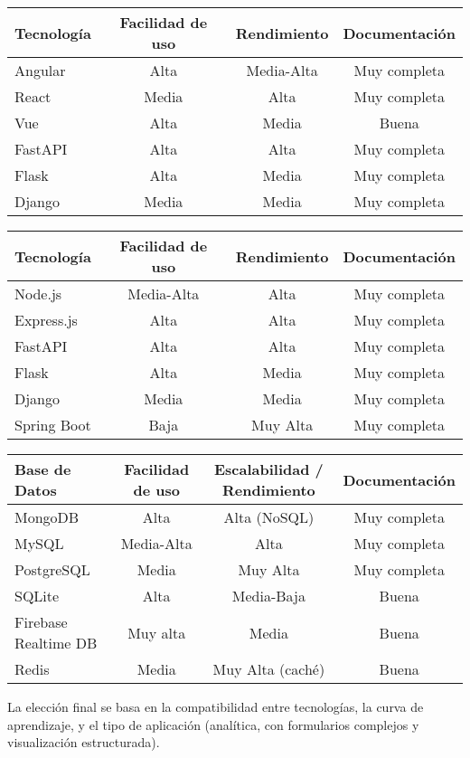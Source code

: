 \begin{center}
\begin{tabular}{|l|c|c|c|}
\hline
\textbf{Tecnología} & \textbf{Facilidad de uso} & \textbf{Rendimiento} & \textbf{Documentación} \\
\hline
Angular & Alta & Media-Alta & Muy completa \\
React & Media & Alta & Muy completa \\
Vue & Alta & Media & Buena \\
FastAPI & Alta & Alta & Muy completa \\
Flask & Alta & Media & Muy completa \\
Django & Media & Media & Muy completa \\
\hline
\end{tabular}
\end{center}

\begin{center}
\begin{tabular}{|l|c|c|c|}
\hline
\textbf{Tecnología} & \textbf{Facilidad de uso} & \textbf{Rendimiento} & \textbf{Documentación} \\
\hline
Node.js & Media-Alta & Alta & Muy completa \\
Express.js & Alta & Alta & Muy completa \\
FastAPI & Alta & Alta & Muy completa \\
Flask & Alta & Media & Muy completa \\
Django & Media & Media & Muy completa \\
Spring Boot & Baja & Muy Alta & Muy completa \\
\hline
\end{tabular}
\end{center}

\begin{center}
\begin{tabular}{|l|c|c|c|}
\hline
\textbf{Base de Datos} & \textbf{Facilidad de uso} & \textbf{Escalabilidad / Rendimiento} & \textbf{Documentación} \\
\hline
MongoDB & Alta & Alta (NoSQL) & Muy completa \\
MySQL & Media-Alta & Alta & Muy completa \\
PostgreSQL & Media & Muy Alta & Muy completa \\
SQLite & Alta & Media-Baja & Buena \\
Firebase Realtime DB & Muy alta & Media & Buena \\
Redis & Media & Muy Alta (caché) & Buena \\
\hline
\end{tabular}
\end{center}

La elección final se basa en la compatibilidad entre tecnologías, la curva de aprendizaje, y el tipo de aplicación (analítica, con formularios complejos y visualización estructurada).

